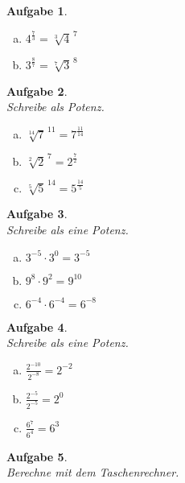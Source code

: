 \documentclass[12pt,fleqn]{article}
\theoremstyle{aufg}
\newtheorem{aufgabe}{Aufgabe}
\theoremstyle{bsp}
\begin{document}
\begin{flushleft}
\begin{aufgabe}
\begin{multicols}{3}
\begin{enumerate}[a)]
$5^{\frac{8}{11}}=$$\sqrt[11]{5}^{\,8}$
\item 
$4^{\frac{7}{3}}=$$\sqrt[3]{4}^{\,7}$
\item 
$3^{\frac{8}{7}}=$$\sqrt[7]{3}^{\,8}$
\end{enumerate} 
\end{multicols} 
\end{aufgabe} 
\begin{aufgabe} ~ \\ 
Schreibe als Potenz. \\ 
\begin{multicols}{3} 
\begin{enumerate}[a)] 
\item 
$\sqrt[14]{7}^{\,11}=$$7^{\frac{11}{14}}$
\item 
$\sqrt[2]{2}^{\,7}=$$2^{\frac{7}{2}}$
\item 
$\sqrt[5]{5}^{\,14}=$$5^{\frac{14}{5}}$
\end{enumerate} 
\end{multicols} 
\end{aufgabe} 
\begin{aufgabe} ~ \\ 
Schreibe als eine Potenz. \\ 
\begin{multicols}{3} 
\begin{enumerate}[a)] 
\item 
$3^{-5}\cdot3^{0}=$$3^{-5}$
\item 
$9^{8}\cdot9^{2}=$$9^{10}$
\item 
$6^{-4}\cdot6^{-4}=$$6^{-8}$
\end{enumerate} 
\end{multicols} 
\end{aufgabe} 
\begin{aufgabe} ~ \\ 
Schreibe als eine Potenz. \\ 
\begin{multicols}{3} 
\begin{enumerate}[a)] 
\item 
$\frac{2^{-10}}{2^{-8}}=$$2^{-2}$
\item 
$\frac{2^{-5}}{2^{-5}}=$$2^{0}$
\item 
$\frac{6^{7}}{6^{4}}=$$6^{3}$
\end{enumerate} 
\end{multicols} 
\end{aufgabe} 
\begin{aufgabe} ~ \\ 
Berechne mit dem Taschenrechner. \\ 

\end{aufgabe}
\end{flushleft}
\end{document}
